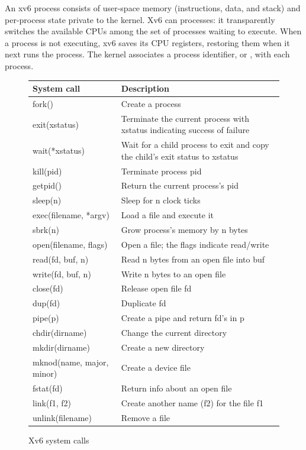 An xv6 process consists of user-space memory (instructions, data, and stack)
and per-process state private to the kernel.
Xv6 can
processes: it transparently switches the available CPUs
among the set of processes waiting to execute.
When a process is not executing, xv6 saves its CPU registers,
restoring them when it next runs the process.
The kernel associates a process identifier, or
,
with each process.

\begin{figure}[t]
\center
\begin{tabular}{ll}
{\bf System call} & {\bf Description} \\
\midrule
fork() & Create a process \\
exit(xstatus) & Terminate the current process with xstatus indicating success of failure \\
wait(*xstatus) & Wait for a child process to exit and copy the child's exit status to xstatus \\
kill(pid) & Terminate process pid \\
getpid() & Return the current process's pid \\
sleep(n) & Sleep for n clock ticks \\
exec(filename, *argv) & Load a file and execute it \\
sbrk(n) & Grow process's memory by n bytes \\
open(filename, flags) & Open a file; the flags indicate read/write \\
read(fd, buf, n) & Read n bytes from an open file into buf \\
write(fd, buf, n) & Write n bytes to an open file \\
close(fd) & Release open file fd \\
dup(fd) & Duplicate fd \\
pipe(p) & Create a pipe and return fd's in p \\
chdir(dirname) & Change the current directory \\
mkdir(dirname) & Create a new directory \\
mknod(name, major, minor) & Create a device file \\
fstat(fd) & Return info about an open file \\
link(f1, f2) & Create another name (f2) for the file f1 \\
unlink(filename) & Remove a file \\
\end{tabular}
\caption{Xv6 system calls}
\label{fig:api}
\end{figure}

